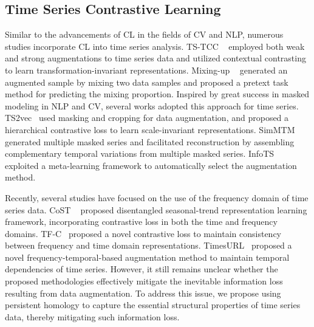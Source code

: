\subsection{Time Series Contrastive Learning} 
Similar to the advancements of CL in the fields of CV and NLP, numerous studies incorporate CL into time series analysis. TS-TCC ~\cite{TSTCC} employed both weak and strong augmentations to time series data and utilized contextual contrasting to learn transformation-invariant representations. Mixing-up ~\cite{wickstrom2022mixing} generated an augmented sample by mixing two data samples and proposed a pretext task method for predicting the mixing proportion. Inspired by great success in masked modeling in NLP and CV, several works adopted this approach for time series. TS2vec~\cite{yue2022ts2vec} used masking and cropping for data augmentation, and proposed a hierarchical contrastive loss to learn scale-invariant representations. SimMTM~\cite{dong2024simmtm} generated multiple masked series and facilitated reconstruction by assembling complementary temporal variations from multiple masked series. InfoTS~\cite{luo2023time} exploited a meta-learning framework to automatically select the augmentation method.

Recently, several studies have focused on the use of the frequency domain of time series data. CoST ~\cite{woo2022cost} proposed disentangled seasonal-trend representation learning framework, incorporating contrastive loss in both the time and frequency domains. TF-C~\cite{zhang2022self} proposed a novel contrastive loss to maintain consistency between frequency and time domain representations. TimesURL~\cite{liu2024timesurl} proposed a novel frequency-temporal-based augmentation method to maintain temporal dependencies of time series. However, it still remains unclear whether the proposed methodologies effectively mitigate the inevitable information loss resulting from data augmentation. To address this issue, we propose using persistent homology to capture the essential structural properties of time series data, thereby mitigating such information loss.
